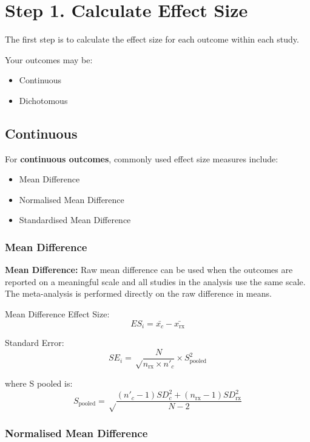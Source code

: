 \documentclass[
]{book}
\begin{document}
\hypertarget{step-1.-calculate-effect-size}{%
\section{Step 1. Calculate Effect Size}\label{step-1.-calculate-effect-size}}

The first step is to calculate the effect size for each outcome within each study.

Your outcomes may be:

\begin{itemize}
\item
  Continuous
\item
  Dichotomous
\end{itemize}

\hypertarget{continuous}{%
\subsection{Continuous}\label{continuous}}

For \textbf{continuous outcomes}, commonly used effect size measures include:

\begin{itemize}
\item
  Mean Difference
\item
  Normalised Mean Difference
\item
  Standardised Mean Difference
\end{itemize}

\hypertarget{mean-difference}{%
\subsubsection{Mean Difference}\label{mean-difference}}

\textbf{Mean Difference:} Raw mean difference can be used when the outcomes are reported on a meaningful scale and all studies in the analysis use the same scale. The meta-analysis is performed directly on the raw difference in means.

Mean Difference Effect Size:
\[ ES_i = \bar{x_c} - \bar{x_\text{rx}}\]

Standard Error:
\[ SE_i = \sqrt \frac {N}{n_{\text{rx}} \times n'_c} \times S_{\text{pooled}}^2 \]

where S pooled is:
\[S_{\text{pooled}} = \sqrt \frac {(n'_c - 1)SD_c^2 + (n_{\text{rx}} - 1)SD_{\text{rx}}^2}{N -2} \]

\hypertarget{normalised-mean-difference}{%
\subsubsection{Normalised Mean Difference}\label{normalised-mean-difference}}
\end{document}
